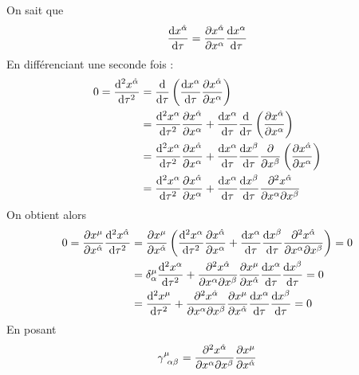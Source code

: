 On sait que 
\begin{align}
    \frac{\mathrm{d} x^{\hat{\alpha}}}{\mathrm{d} \tau} = \frac{\partial x^{\hat{\alpha}}}{\partial x^{\alpha}}\frac{\mathrm{d} x^{\alpha}}{\mathrm{d}\tau}
\end{align}
En différenciant une seconde fois :
\begin{align}
    0 = \frac{\mathrm{d} ^2x^{\hat{\alpha}}}{\mathrm{d} \tau^2} &= \frac{\mathrm{d} }{\mathrm{d} \tau}\left(\frac{\mathrm{d} x^{\alpha}}{\mathrm{d} \tau}\frac{\partial x^{\hat{\alpha}}}{\partial x^{\alpha}}\right)\\
    &= \frac{\mathrm{d} ^2x^{\alpha}}{\mathrm{d} \tau^2}\frac{\partial x^{\hat{\alpha}}}{\partial x^{\alpha}} + \frac{\mathrm{d} x^{\alpha}}{\mathrm{d} \tau}\frac{\mathrm{d} }{\mathrm{d} \tau}\left(\frac{\partial x^{\hat{\alpha}}}{\partial x^{\alpha}}\right)\\
    &= \frac{\mathrm{d} ^2x^{\alpha}}{\mathrm{d} \tau^2}\frac{\partial x^{\hat{\alpha}}}{\partial x^{\alpha}} + \frac{\mathrm{d} x^{\alpha}}{\mathrm{d} \tau}\frac{\mathrm{d} x^{\beta}}{\mathrm{d} \tau} \frac{\partial}{\partial x^{\beta}}\left(\frac{\partial x^{\hat{\alpha}}}{\partial x^{\alpha}}\right)\\
    &=\frac{\mathrm{d} ^2x^{\alpha}}{\mathrm{d} \tau^2}\frac{\partial x^{\hat{\alpha}}}{\partial x^{\alpha}} + \frac{\mathrm{d} x^{\alpha}}{\mathrm{d} \tau}\frac{\mathrm{d} x^{\beta}}{\mathrm{d} \tau} \frac{\partial^2 x^{\hat{\alpha}}}{\partial x^{\alpha}\partial x^{\beta}}
\end{align}
On obtient alors
\begin{align}
    0 = \frac{\partial x^{\mu}}{\partial x^{\hat{\alpha}}} \frac{\mathrm{d} ^2x^{\hat{\alpha}}}{\mathrm{d} \tau^2}&= \frac{\partial x^{\mu}}{\partial x^{\hat{\alpha}}} \left(\frac{\mathrm{d} ^2x^{\alpha}}{\mathrm{d} \tau^2}\frac{\partial x^{\hat{\alpha}}}{\partial x^{\alpha}} + \frac{\mathrm{d} x^{\alpha}}{\mathrm{d} \tau}\frac{\mathrm{d} x^{\beta}}{\mathrm{d} \tau} \frac{\partial^2 x^{\hat{\alpha}}}{\partial x^{\alpha}\partial x^{\beta}}\right)=0\\
    &=  \delta^{\mu}_{\alpha}\frac{\mathrm{d} ^2x^{\alpha}}{\mathrm{d} \tau^2} + \frac{\partial^2 x^{\hat{\alpha}}}{\partial x^{\alpha}\partial x^{\beta}}\frac{\partial x^{\mu}}{\partial x^{\hat{\alpha}}} \frac{\mathrm{d} x^{\alpha}}{\mathrm{d} \tau}\frac{\mathrm{d} x^{\beta}}{\mathrm{d} \tau}=0\\
    &= \frac{\mathrm{d} ^2x^{\mu}}{\mathrm{d} \tau^2} + \frac{\partial^2 x^{\hat{\alpha}}}{\partial x^{\alpha}\partial x^{\beta}}\frac{\partial x^{\mu}}{\partial x^{\hat{\alpha}}} \frac{\mathrm{d} x^{\alpha}}{\mathrm{d} \tau}\frac{\mathrm{d} x^{\beta}}{\mathrm{d} \tau}=0
\end{align}
En posant
\begin{equation}
    \gamma\indices{^\mu_{\!\alpha\beta}} = \frac{\partial^2 x^{\hat{\alpha}}}{\partial x^{\alpha}\partial x^{\beta}}\frac{\partial x^{\mu}}{\partial x^{\hat{\alpha}}}
\end{equation}
